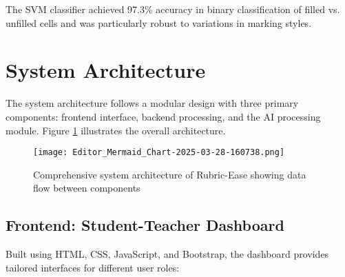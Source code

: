 \documentclass[12pt]{article}
\begin{document}

The SVM classifier achieved 97.3\% accuracy in binary classification of filled vs. unfilled cells and was particularly robust to variations in marking styles.

\section{System Architecture}
The system architecture follows a modular design with three primary components: frontend interface, backend processing, and the AI processing module. Figure \ref{fig:system_architecture} illustrates the overall architecture.

\begin{figure}[H]
    \centering
    \texttt{[image: Editor\_Mermaid\_Chart-2025-03-28-160738.png]}
    \caption{Comprehensive system architecture of Rubric-Ease showing data flow between components}
    \label{fig:system_architecture}
\end{figure}

\subsection{Frontend: Student-Teacher Dashboard}
Built using HTML, CSS, JavaScript, and Bootstrap, the dashboard provides tailored interfaces for different user roles:


\end{document}
\end{itemize}
\end{document}
